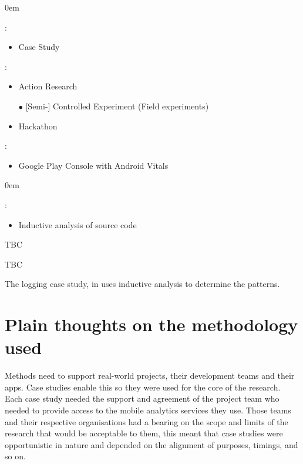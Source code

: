 {\footnotesize
\begin{description}
    \itemsep0em
    \item[Research Method] :
        \begin{itemize}
            \item Case Study
        \end{itemize}
    \item[Research Tools] :
    \begin{itemize}
        \itemsep0em
        \item Action Research
        \item[$\bullet$] [Semi-] Controlled Experiment (Field experiments)
        \item Hackathon
    \end{itemize}
    \item[Analytics Provider] :
        \begin{itemize}
            \item Google Play Console with Android Vitals
        \end{itemize}
    \label{methodology-map-kiwix-case-study}    
\end{description}
}

{\footnotesize
\begin{description}
    \itemsep0em
    \item[Research  Method] :
        \begin{itemize}
            \item Inductive analysis of source code
        \end{itemize}
    \item[Research Tool] TBC
    \item[Data Analysis Method] TBC
    \label{methodology-map-logging-using-mobile-analytics}
\end{description}
}

The logging case study, in  uses inductive analysis to determine the patterns. 

\section*{Plain thoughts on the methodology used}
Methods need to support real-world projects, their development teams and their apps. Case studies enable this so they were used for the core of the research. Each case study needed the support and agreement of the project team who needed to provide access to the mobile analytics services they use. Those teams and their respective organisations had a bearing on the scope and limits of the research that would be acceptable to them, this meant that case studies were opportunistic in nature and depended on the alignment of purposes, timings, and so on.

